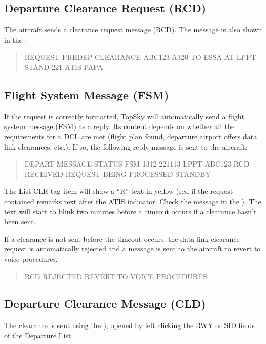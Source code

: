 \documentclass[11pt,a4paper,oldfontcommands]{memoir}
\begin{document}
\subsection*{Departure Clearance Request (RCD)}

The aircraft sends a clearance request message (RCD). The message is also shown in the \textit{}:

\begin{quote}
  REQUEST PREDEP CLEARANCE ABC123 A320 TO ESSA AT LPPT STAND 221 ATIS PAPA
\end{quote}

\subsection*{Flight System Message (FSM)}

If the request is correctly formatted, TopSky will automatically send a flight system message (FSM) as a reply. Its content depends on whether all the requirements for a DCL are met (flight plan found, departure airport offers data link clearances, etc.). If so, the following reply message is sent to the aircraft:

\begin{quote}
  DEPART MESSAGE STATUS FSM 1312 221113 LPPT ABC123 RCD RECEIVED REQUEST BEING PROCESSED STANDBY 
\end{quote}

The List CLR tag item will show a “R” text in yellow (red if the request contained remarks text after the ATIS indicator. Check the message in the \textit{}). The text will start to blink two minutes before a timeout occurs if a clearance hasn’t been sent.

If a clearance is not sent before the timeout occurs, the data link clearance request is automatically rejected and a message is sent to the aircraft to revert to voice procedures.

\begin{quote}
  RCD REJECTED REVERT TO VOICE PROCEDURES
\end{quote}

\subsection*{Departure Clearance Message (CLD)}

The clearance is sent using the \textit{}), opened by left clicking the RWY or SID fields of the Departure List. 
\end{document}
